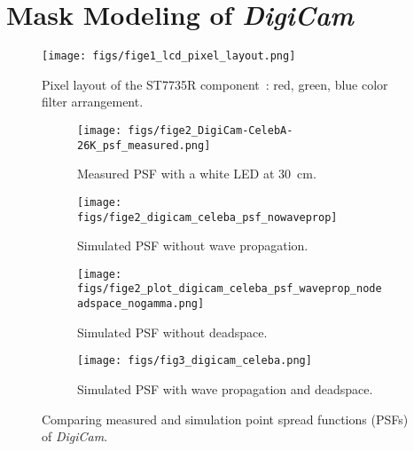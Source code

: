 \section{Mask Modeling of \textit{DigiCam}}
\label{app:mask_modeling}

\begin{figure}[t!]
		\centering
		\texttt{[image: figs/fige1\_lcd\_pixel\_layout.png]}
	\caption{Pixel layout of the ST7735R component~\cite{adafruitlcd}: red, green, blue color filter arrangement.}
	\label{fig:pixel_layout}
\end{figure}

\begin{figure*}[t!]
    \centering
    \begin{subfigure}{0.23\linewidth}
		\centering
\texttt{[image: figs/fige2\_DigiCam-CelebA-26K\_psf\_measured.png]} 
		\caption{Measured PSF with a white LED at \SI{30}{\centi\meter}.}
		\label{fig:digicam_celeba_meas}
	\end{subfigure}
 \begin{subfigure}{0.23\linewidth}
		\centering
\texttt{[image: figs/fige2\_digicam\_celeba\_psf\_nowaveprop]} 
		\caption{Simulated PSF without wave propagation.}
		\label{fig:digicam_celeba_nowave}
	\end{subfigure}
 \begin{subfigure}{0.23\linewidth}
		\centering
\texttt{[image: figs/fige2\_plot\_digicam\_celeba\_psf\_waveprop\_nodeadspace\_nogamma.png]} 
		\caption{Simulated PSF without deadspace.}
		\label{fig:digicam_celeba_wave_nodead}
	\end{subfigure}
 \begin{subfigure}{0.23\linewidth}
		\centering
\texttt{[image: figs/fig3\_digicam\_celeba.png]} 
		\caption{Simulated PSF with wave propagation and deadspace.}
		\label{fig:digicam_celeba_wave}
	\end{subfigure}
  \caption{Comparing measured and simulation point spread functions (PSFs) of \textit{DigiCam}.}
	\label{fig:compared_psfs_crop_app}
\end{figure*}

